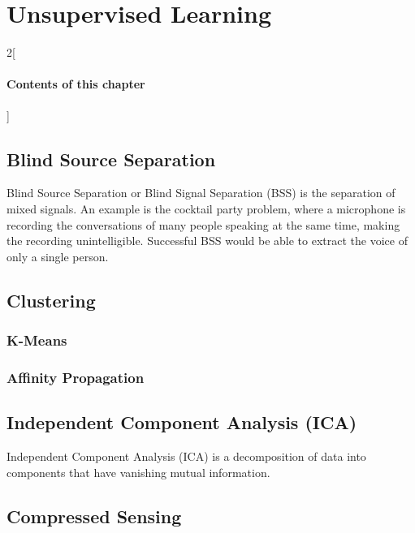 \chapter{Unsupervised Learning}

\begin{multicols}{2}[\subsubsection*{Contents of this chapter}]
\end{multicols}

\section{Blind Source Separation}
Blind Source Separation or Blind Signal Separation (BSS) is the separation of mixed signals. An example is the cocktail party problem, where a microphone is recording the conversations of many people speaking at the same time, making the recording unintelligible. Successful BSS would be able to extract the voice of only a single person.  

\section{Clustering}

\subsection{K-Means}
\subsection{Affinity Propagation}

\section{Independent Component Analysis (ICA)}
Independent Component Analysis (ICA) is a decomposition of data into components that have vanishing mutual information. 

\section{Compressed Sensing}









\chapauthor{}	